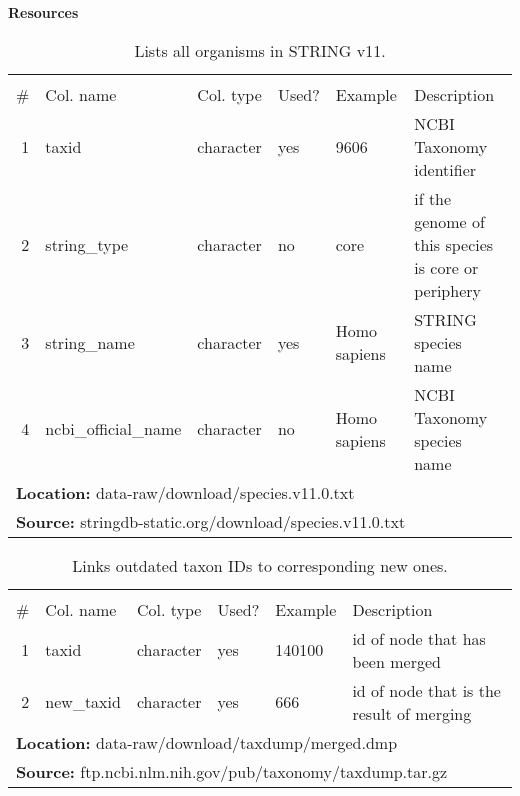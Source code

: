 \textbf{Resources}\\

\begin{table}[H]

\caption{\label{tab:string_species}Lists all organisms in STRING v11.}
\begin{tabular}[t]{rllll>{\raggedright\arraybackslash}p{18em}}
\toprule
\multicolumn{6}{c}{\bgroup\fontsize{12}{14}\selectfont \cellcolor[HTML]{EEEEEE}{\ttfamily{\textbf{string\_species}}}\egroup{}} \\
\cmidrule(l{3pt}r{3pt}){1-6}
\# & Col. name & Col. type & Used? & Example & Description\\
\midrule
\rowcolor{gray!6}  1 & taxid & character & yes & 9606 & NCBI Taxonomy identifier\\
2 & string\_type & character & no & core & if the genome of this species is core or periphery\\
\rowcolor{gray!6}  3 & string\_name & character & yes & Homo sapiens & STRING species name\\
4 & ncbi\_official\_name & character & no & Homo sapiens & NCBI Taxonomy species name\\
\bottomrule
\multicolumn{6}{l}{\textbf{Location: } data-raw/download/species.v11.0.txt}\\
\multicolumn{6}{l}{\textbf{Source: } stringdb-static.org/download/species.v11.0.txt}\\
\end{tabular}
\end{table}
\begin{table}[H]

\caption{\label{tab:ncbi_merged_ids}Links outdated taxon IDs to corresponding new ones.}
\begin{tabular}[t]{rllll>{\raggedright\arraybackslash}p{18em}}
\toprule
\multicolumn{6}{c}{\bgroup\fontsize{12}{14}\selectfont \cellcolor[HTML]{EEEEEE}{\ttfamily{\textbf{ncbi\_merged\_ids}}}\egroup{}} \\
\cmidrule(l{3pt}r{3pt}){1-6}
\# & Col. name & Col. type & Used? & Example & Description\\
\midrule
\rowcolor{gray!6}  1 & taxid & character & yes & 140100 & id of node that has been merged\\
2 & new\_taxid & character & yes & 666 & id of node that is the result of merging\\
\bottomrule
\multicolumn{6}{l}{\textbf{Location: } data-raw/download/taxdump/merged.dmp}\\
\multicolumn{6}{l}{\textbf{Source: } ftp.ncbi.nlm.nih.gov/pub/taxonomy/taxdump.tar.gz}\\
\end{tabular}
\end{table}
